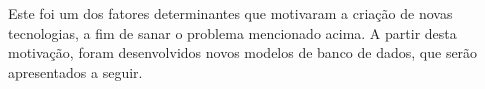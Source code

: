 


\par Este foi um dos fatores determinantes que motivaram a criação de novas tecnologias, a fim de sanar o problema mencionado acima. A partir desta motivação, foram desenvolvidos novos modelos de banco de dados, que serão apresentados a seguir.
